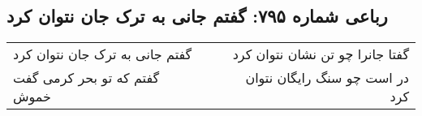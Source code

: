\begin{center}
\section*{رباعی شماره ۷۹۵: گفتم جانی به ترک جان نتوان کرد}
\label{sec:0795}
\begin{longtable}{l p{0.5cm} r}
گفتم جانی به ترک جان نتوان کرد
&&
گفتا جانرا چو تن نشان نتوان کرد
\\
گفتم که تو بحر کرمی گفت خموش
&&
در است چو سنگ رایگان نتوان کرد
\\
\end{longtable}
\end{center}
